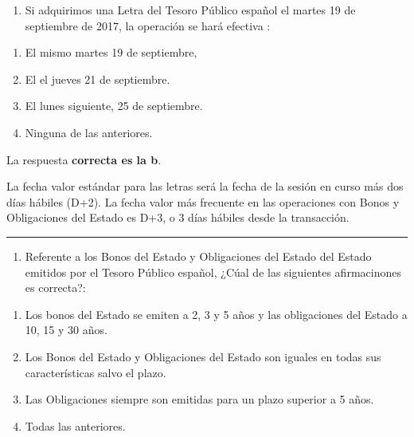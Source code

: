 \documentclass[
  letterpaper,
  DIV=11,
  numbers=noendperiod]{scrreprt}
\providecommand{\tightlist}{%
  \setlength{\itemsep}{0pt}\setlength{\parskip}{0pt}}\usepackage{longtable,booktabs,array}
\begin{document}
\begin{enumerate}
\def\labelenumi{\arabic{enumi}.}
\setcounter{enumi}{20}
\tightlist
\item
  Si adquirimos una Letra del Tesoro Público español el martes 19 de
  septiembre de 2017, la operación se hará efectiva :
\end{enumerate}

\begin{enumerate}
\def\labelenumi{\alph{enumi}.}
\item
  El mismo martes 19 de septiembre,
\item
  El el jueves 21 de septiembre.
\item
  El lunes siguiente, 25 de septiembre.
\item
  Ninguna de las anteriores.
\end{enumerate}

\begin{tcolorbox}[enhanced jigsaw, left=2mm, opacityback=0, colback=white, breakable, arc=.35mm, bottomrule=.15mm, rightrule=.15mm, toprule=.15mm, leftrule=.75mm, colframe=quarto-callout-tip-color-frame]
\begin{minipage}[t]{5.5mm}
\textcolor{quarto-callout-tip-color}{\faLightbulb}
\end{minipage}%
\begin{minipage}[t]{\textwidth - 5.5mm}

La respuesta \textbf{correcta es la b}.

La fecha valor estándar para las letras será la fecha de la sesión en
curso más dos días hábiles (D+2). La fecha valor más frecuente en las
operaciones con Bonos y Obligaciones del Estado es D+3, o 3 días hábiles
desde la transacción.

\end{minipage}%
\end{tcolorbox}

\begin{center}\rule{0.5\linewidth}{0.5pt}\end{center}

\begin{enumerate}
\def\labelenumi{\arabic{enumi}.}
\setcounter{enumi}{21}
\tightlist
\item
  Referente a los Bonos del Estado y Obligaciones del Estado del Estado
  emitidos por el Tesoro Público español, ¿Cúal de las siguientes
  afirmacinones es correcta?:
\end{enumerate}

\begin{enumerate}
\def\labelenumi{\alph{enumi}.}
\item
  Los bonos del Estado se emiten a 2, 3 y 5 años y las obligaciones del
  Estado a 10, 15 y 30 años.
\item
  Los Bonos del Estado y Obligaciones del Estado son iguales en todas
  sus características salvo el plazo.
\item
  Las Obligaciones siempre son emitidas para un plazo superior a 5 años.
\item
  Todas las anteriores.
\end{enumerate}
\end{document}
